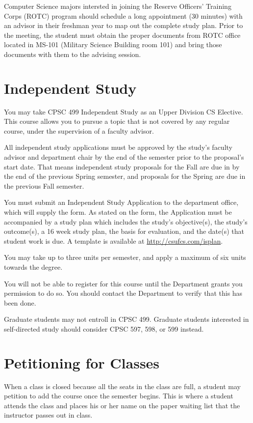 \documentclass{book}
\newcommand{\shrunkurl}[1]{\url{http://csufcs.com/#1}}
\begin{document}
Computer Science majors intersted in joining the Reserve Officers' Training
Corps (ROTC) program should schedule a long appointment (30 minutes) with an
advisor in their freshman year to map out the complete study plan.  Prior to
the meeting, the student must obtain the proper documents from ROTC office
located in MS-101 (Military Science Building room 101) and bring those
documents with them to the advising session.

\section{Independent Study}

You may take CPSC 499 Independent Study as an Upper Division CS
Elective. This course allows you to pursue a topic that is not covered
by any regular course, under the supervision of a faculty advisor.

All independent study applications must be approved by the study's
faculty advisor and department chair by the end of the semester prior
to the proposal's start date. That means independent study proposals
for the Fall are due in by the end of the previous Spring semester,
and proposals for the Spring are due in the previous Fall semester.

You must submit an Independent Study Application to the department
office, which will supply the form. As stated on the form, the
Application must be accompanied by a study plan which includes the
study's objective(s), the study's outcome(s), a 16 week study plan,
the basis for evaluation, and the date(s) that student work is due. A
template is available at \shrunkurl{isplan}.

You may take up to three units per semester, and apply a maximum of
six units towards the degree.

You will not be able to register for this course until the Department
grants you permission to do so. You should contact the Department to
verify that this has been done.

Graduate students may not entroll in CPSC 499. Graduate students
interested in self-directed study should consider CPSC 597, 598, or
599 instead.

\section{Petitioning for Classes}

When a class is closed because all the seats in the class are full, a
student may petition to add the course once the semester begins. This
is where a student attends the class and places his or her name on the
paper waiting list that the instructor passes out in class.
\end{document}
